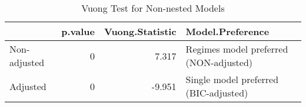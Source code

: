 \begin{table}

\caption{Vuong Test for Non-nested Models}
\centering
\begin{tabular}[t]{lrrl}
\toprule
  & p.value & Vuong.Statistic & Model.Preference\\
\midrule
Non-adjusted & 0 & 7.317 & Regimes model preferred (NON-adjusted)\\
Adjusted & 0 & -9.951 & Single model preferred (BIC-adjusted)\\
\bottomrule
\end{tabular}
\end{table}
